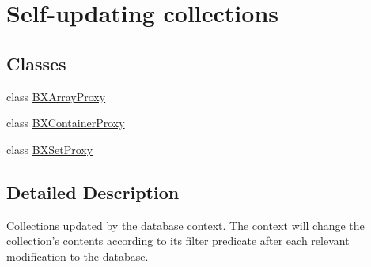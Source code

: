 \hypertarget{group__auto__containers}{}\section{Self-\/updating collections}
\label{group__auto__containers}
\subsection*{Classes}
\begin{DoxyCompactItemize}
\item 
class \hyperlink{interface_b_x_array_proxy}{B\+X\+Array\+Proxy}
\item 
class \hyperlink{interface_b_x_container_proxy}{B\+X\+Container\+Proxy}
\item 
class \hyperlink{interface_b_x_set_proxy}{B\+X\+Set\+Proxy}
\end{DoxyCompactItemize}


\subsection{Detailed Description}
Collections updated by the database context. The context will change the collection's contents according to its filter predicate after each relevant modification to the database. 